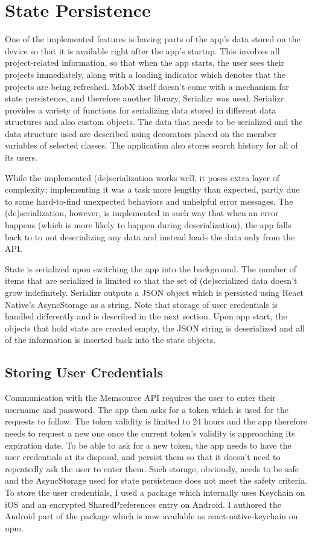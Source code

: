 \section{State Persistence}
\label{sec:persistence}
One of the implemented features is having parts of the app's data stored on the device so that it is available right after the app’s startup. This involves all project-related information, so that when the app starts, the user sees their projects immediately, along with a loading indicator which denotes that the projects are being refreshed. MobX itself doesn't come with a mechanism for state persistence, and therefore another library, Serializr was used. Serializr provides a variety of functions for serializing data stored in different data structures and also custom objects. The data that needs to be serialized and the data structure used are described using decorators placed on the member variables of selected classes. The application also stores search history for all of its users. 

While the implemented (de)serialization works well, it poses extra layer of complexity; implementing it was a task more lengthy than expected, partly due to some hard-to-find unexpected behaviors and unhelpful error messages. The (de)serialization, however, is implemented in such way that when an error happens (which is more likely to happen during deserialization), the app falls back to to not deserializing any data and instead loads the data only from the API.


State is serialized upon switching the app into the background. The number of items that are serialized is limited so that the set of (de)serialized data doesn't grow indefinitely. Serializr outputs a JSON object which is persisted using React Native’s AsyncStorage as a string. Note that storage of user credentials is handled differently and is described in the next section. Upon app start, the objects that hold state are created empty, the JSON string is deserialized and all of the information is inserted back into the state objects. 

\subsection{Storing User Credentials}
\label{sec:keychain}

Communication with the Memsource API requires the user to enter their username and password. The app then asks for a token which is used for the requests to follow. The token validity is limited to 24 hours and the app therefore needs to request a new one once the current token's validity is approaching its expiration date. To be able to ask for a new token, the app needs to have the user credentials at its disposal, and persist them so that it doesn't need to repeatedly ask the user to enter them. Such storage, obviously, needs to be safe and the AsyncStorage used for state persistence does not meet the safety criteria. To store the user credentials, I used a package which internally uses Keychain on iOS and an encrypted SharedPreferences entry on Android. I authored the Android part of the package which is now available as react-native-keychain on npm. 


